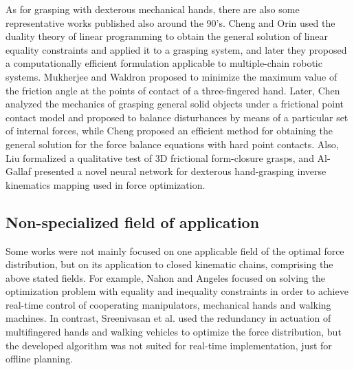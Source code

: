 		As for grasping with dexterous mechanical hands, there are also some representative works published
		also around the 90's.
		Cheng and Orin \cite{Cheng_ICRA1989} \cite{Cheng_TransRoboticsAuto1990} used the duality theory of
		linear programming to obtain the general solution of linear equality constraints and applied it to
		a grasping system, and later they \cite{Cheng_TransSysManCyb1991a} \cite{Cheng_TransSysManCyb1991b}
		proposed a computationally efficient formulation applicable to multiple-chain robotic systems.
		Mukherjee and Waldron \cite{Mukherjee_MechDesign1992} proposed to minimize the maximum value of
		the friction angle at the points of contact of a three-fingered hand.
		Later, Chen \cite{Chen_ICRA1995} analyzed the mechanics of grasping general solid objects under a
		frictional point contact model and proposed to balance disturbances by means of a particular set
		of internal forces, while Cheng \cite{Cheng_SysManCyb1997} proposed an efficient method for obtaining
		the general solution for the force balance equations with hard point contacts.
		Also, Liu \cite{LiuY_TransRoboticsAuto1999} formalized a qualitative test of 3D frictional
		form-closure grasps, and Al-Gallaf \cite{AlGallaf_RobAutoSys2006} presented a novel neural
		network for dexterous hand-grasping inverse kinematics mapping used in force optimization.
		
	\subsection{Non-specialized field of application}
		\label{sub:non_specialized}
		
		Some works were not mainly focused on one applicable field of the optimal force distribution,
		but on its application to closed kinematic chains, comprising the above stated fields.
		For example, Nahon and Angeles \cite{Nahon_TransRoboticsAuto1992} focused on solving the
		optimization problem with equality and inequality constraints in order to achieve real-time
		control of cooperating manipulators, mechanical hands and walking machines.
		In contrast, Sreenivasan et al. \cite{Sreenivasan_MechDesign1996} used the redundancy in actuation
		of multifingered hands and walking vehicles to optimize the force distribution, but the developed
		algorithm was not suited for real-time implementation, just for offline planning.